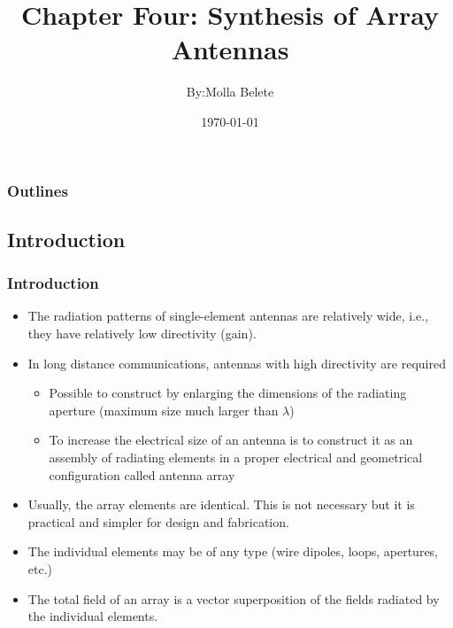 \documentclass{beamer}
\title{Chapter Four: Synthesis of Array Antennas} %
\author{By:Molla Belete} %
\institute[] %
{University of Debre Tabor \\ %
\medskip
\textit{mole.ece2014@gmail.com} %
}
\date{\today} %
\begin{document}
	\begin{frame}
		\titlepage %
	\end{frame}
	
	\begin{frame}
		\frametitle{Outlines} 
		\tableofcontents 
	\end{frame}
	
	\begin{frame}
		\section{Introduction}
		\frametitle{Introduction}
		\begin{itemize}
			\item The radiation patterns of single-element antennas are relatively wide,
			i.e., they have relatively low directivity (gain).
			\item In long distance communications, antennas with high directivity are required
			\begin{itemize}
				\item Possible to construct by enlarging the dimensions of the radiating aperture
				(maximum size much larger than $\lambda$)
				\item To increase the electrical size of an antenna is to construct it as an assembly of radiating elements in a proper electrical and geometrical configuration called \color{blue}antenna array\color{black}
			\end{itemize}
			\item Usually, the array elements are identical. This is not necessary but it is practical and simpler for design and fabrication. 
			\item The individual elements may be of any type (wire dipoles, loops, apertures, etc.) 
			\item The total field of an array is a vector superposition of the
			fields radiated by the individual elements. 
		\end{itemize}
	\end{frame}
	
\end{document}
